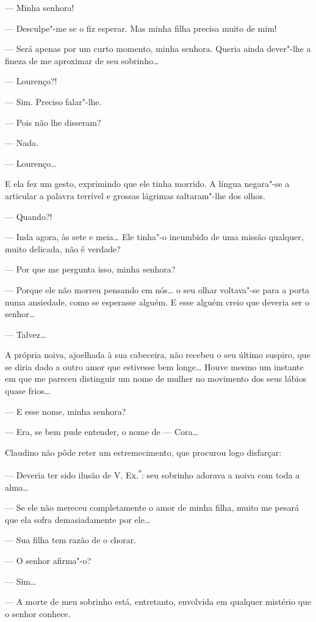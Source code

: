 --- Minha senhora!

--- Desculpe"-me se o fiz esperar. Mas minha filha precisa muito de mim!

--- Será apenas por um curto momento, minha senhora. Queria ainda
dever"-lhe a fineza de me aproximar de seu sobrinho\ldots{}

--- Lourenço?!

--- Sim. Preciso falar"-lhe.

--- Pois não lhe disseram?

--- Nada.

--- Lourenço\ldots{}

E ela fez um gesto, exprimindo que ele tinha morrido. A língua negara"-se
a articular a palavra terrível e grossas lágrimas saltaram"-lhe dos
olhos.

--- Quando?!

--- Inda agora, às sete e meia\ldots{} Ele tinha"-o incumbido de uma missão
qualquer, muito delicada, não é verdade?

--- Por que me pergunta isso, minha senhora?

--- Porque ele não morreu pensando em nós\ldots{} o seu olhar voltava"-se para
a porta numa ansiedade, como se esperasse alguém. E esse alguém creio
que deveria ser o senhor\ldots{}

--- Talvez\ldots{}

A própria noiva, ajoelhada à sua cabeceira, não recebeu o seu último
suspiro, que se diria dado a outro amor que estivesse bem longe\ldots{} Houve
mesmo um instante em que me pareceu distinguir um nome de mulher no
movimento dos seus lábios quase frios\ldots{}

--- E esse nome, minha senhora?

--- Era, se bem pude entender, o nome de --- Cora\ldots{}

Claudino não pôde reter um estremecimento, que procurou logo disfarçar:

--- Deveria ter sido ilusão de V. Ex.\textsuperscript{ª}: seu sobrinho
adorava a noiva com toda a alma\ldots{}

--- Se ele não mereceu completamente o amor de minha filha, muito me
pesará que ela sofra demasiadamente por ele\ldots{}

--- Sua filha tem razão de o chorar.

--- O senhor afirma"-o?

--- Sim\ldots{}

--- A morte de meu sobrinho está, entretanto, envolvida em qualquer
mistério que o senhor conhece.

